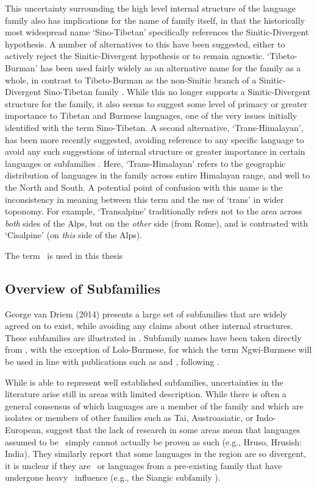 This uncertainty surrounding the high level internal structure of the language family also has implications for the name of family itself, in that the historically most widespread name `Sino-Tibetan' specifically references the Sinitic-Divergent hypothesis. A number of alternatives to this have been suggested, either to actively reject the Sinitic-Divergent hypothesis or to remain agnostic. `Tibeto-Burman' has been used fairly widely as an alternative name for the family as a whole, in contrast to Tibeto-Burman as the non-Sinitic branch of a Sinitic-Divergent Sino-Tibetan family \cite{vanDriem2007a}. While this no longer supports a Sinitic-Divergent structure for the family, it also seems to suggest some level of primacy or greater importance to Tibetan and Burmese languages, one of the very issues initially identified with the term Sino-Tibetan. A second alternative, `Trans-Himalayan', has been more recently suggested, avoiding reference to any specific language to avoid any such suggestions of internal structure or greater importance in certain languages or subfamilies \cite{BlenchPost2014}. Here, `Trans-Himalayan' refers to the geographic distribution of languages in the family across entire Himalayan range, and well to the North and South. A potential point of confusion with this name is the inconsistency in meaning between this term and the use of `trans' in wider toponomy. For example, `Transalpine' traditionally refers not to the area across \textit{both} sides of the Alps, but on the \textit{other} side (from Rome), and is contrasted with `Cisalpine' (on \textit{this} side of the Alps).

The term \lfam\ is used in this thesis \lfamreason\

\subsection{Overview of Subfamilies}\label{ss:THOverview:Subfamilies}

George van Driem (2014) \nocite{VanDriem2014} presents a large set of subfamilies that are widely agreed on to exist, while avoiding any claims about other internal structures. These subfamilies are illustrated in . Subfamily names have been taken directly from , with the exception of Lolo-Burmese, for which the term Ngwi-Burmese will be used in line with publications such as  and , following .

While  is able to represent well established subfamilies, uncertainties in the literature arise still in areas with limited description. While there is often a general consensus of which languages are a member of the family and which are isolates or members of other families such as Tai, Austroasiatic, or Indo-European,  suggest that the lack of research in some areas mean that languages assumed to be \lfam\ simply cannot actually be proven as such (e.g., Hruso, Hrusish: India). They similarly report that some languages in the region are so divergent, it is unclear if they are \lfam\ or languages from a pre-existing family that have undergone heavy \lfam\ influence (e.g., the Siangic subfamily \cite{Post2011}).

